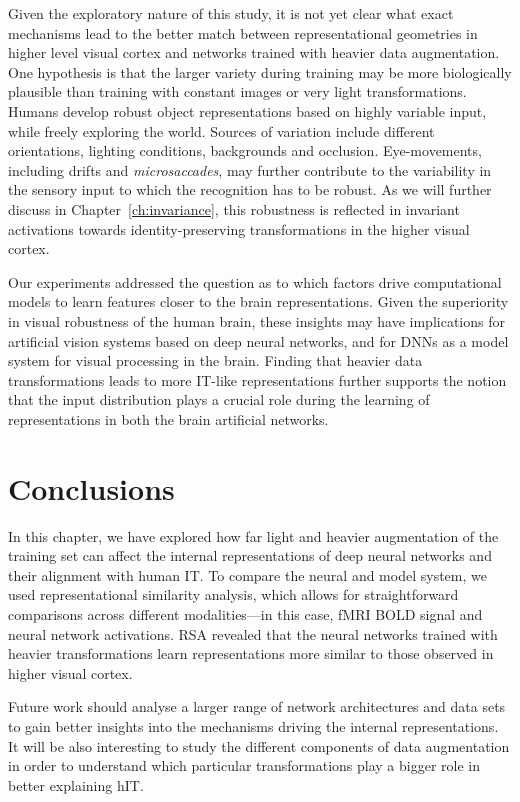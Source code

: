 {Given the exploratory nature of this study, it is not yet clear what exact mechanisms lead to the better match between representational geometries in higher level visual cortex and networks trained with heavier data augmentation. One hypothesis is that the larger variety during training may be more biologically plausible than training with constant images or very light transformations. Humans develop robust object representations based on highly variable input, while freely exploring the world. Sources of variation include different orientations, lighting conditions, backgrounds and occlusion. Eye-movements, including drifts and \textit{microsaccades}, may further contribute to the variability in the sensory input to which the recognition has to be robust. As we will further discuss in Chapter~\ref{ch:invariance}, this robustness is reflected in invariant activations towards identity-preserving transformations in the higher visual cortex.

Our experiments addressed the question as to which factors drive computational models to learn features closer to the brain representations. Given the superiority in visual robustness of the human brain, these insights may have implications for artificial vision systems based on deep neural networks, and for DNNs as a model system for visual processing in the brain. Finding that heavier data transformations leads to more IT-like representations further supports the notion that the input distribution plays a crucial role during the learning of representations in both the brain artificial networks. 

\section{Conclusions}
In this chapter, we have explored how far light and heavier augmentation of the training set can affect the internal representations of deep neural networks and their alignment with human IT. To compare the neural and model system, we used representational similarity analysis, which allows for straightforward comparisons across different modalities---in this case, fMRI BOLD signal and neural network activations. RSA revealed that the neural networks trained with heavier transformations learn representations more similar to those observed in higher visual cortex.

Future work should analyse a larger range of network architectures and data sets to gain better insights into the mechanisms driving the internal representations. It will be also interesting to study the different components of data augmentation in order to understand which particular transformations play a bigger role in better explaining hIT.

\chapterbibliography
}

